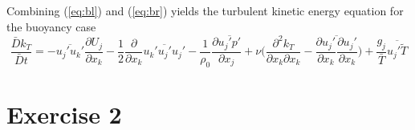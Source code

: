 \documentclass[paper=a4, fontsize=11pt]{scrartcl} %
\numberwithin{equation}{section} %
\numberwithin{figure}{section} %
\numberwithin{table}{section} %
\begin{document}
 	Combining (\ref{eq:bl}) and (\ref{eq:br}) yields the turbulent kinetic energy equation for the buoyancy case
 	\begin{equation}
 		\frac{\bar{D}k_T}{\bar{D}t} = -\overline{u_j' u_k'}\frac{\partial U_j}{\partial x_k} - \frac{1}{2}\frac{\partial}{\partial x_k}\overline{u_k' u_j' u_j'} -\frac{1}{\rho_0} \frac{\partial \overline{u_j' p'}}{\partial x_j} + \nu \Big(\frac{\partial^2 k_T}{\partial x_k \partial x_k} - \overline{\frac{\partial u_j'}{\partial x_k} \frac{\partial u_j'}{\partial x_k}}\Big) + \frac{g_j}{\bar{T}}\overline{u_j' \tilde{T}}
 	\end{equation}
 	
\section{Exercise 2}

	
\end{document}

